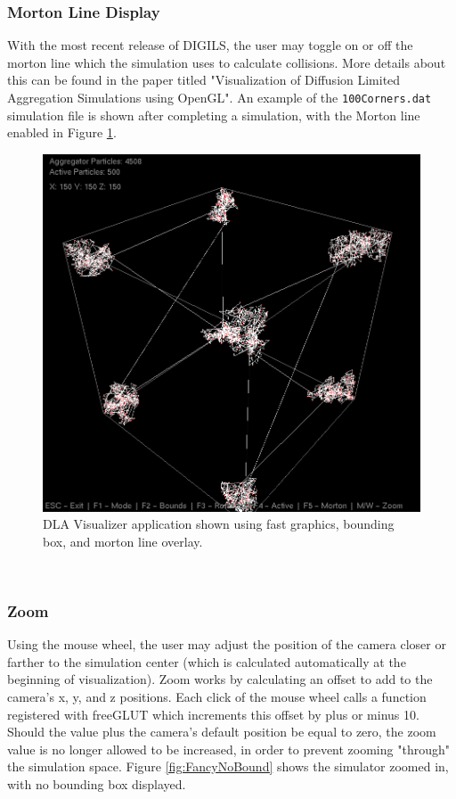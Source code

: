 \documentclass[fleqn,10pt]{UserGuideArx} %
\begin{document}
\subsubsection{Morton Line Display}
With the most recent release of DIGILS, the user may toggle on or off the morton line which the simulation uses to calculate collisions. More details about this can be found in the paper titled "Visualization of Diffusion Limited Aggregation Simulations using OpenGL". An example of the \texttt{100Corners.dat} simulation file is shown after completing a simulation, with the Morton line enabled in Figure \ref{fig:CornersMorton}.
\begin{figure}[!ht]\centering %
    \includegraphics[width=\linewidth]{images/CornersMorton.png}
    \caption{DLA Visualizer application shown using fast graphics, bounding box, and morton line overlay.}
    \label{fig:CornersMorton}
    \end{figure}
~\\

\subsubsection{Zoom}
Using the mouse wheel, the user may adjust the position of the camera closer or farther to the simulation center (which is calculated automatically at the beginning of visualization). Zoom works by calculating an offset to add to the camera's x, y, and z positions. Each click of the mouse wheel calls a function registered with freeGLUT which increments this offset by plus or minus 10. Should the value plus the camera's default position be equal to zero, the zoom value is no longer allowed to be increased, in order to prevent zooming "through" the simulation space. Figure \ref{fig:FancyNoBound} shows the simulator zoomed in, with no bounding box displayed.\\
\end{document}
